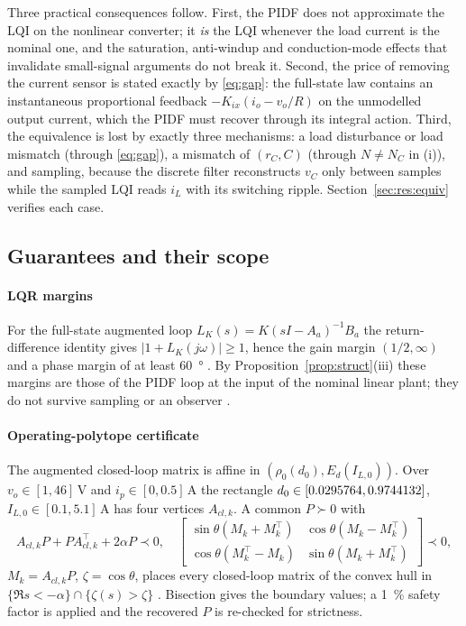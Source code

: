 Three practical consequences follow. First, the PIDF does not approximate the
LQI on the nonlinear converter; it \emph{is} the LQI whenever the load current
is the nominal one, and the saturation, anti-windup and conduction-mode effects
that invalidate small-signal arguments do not break it. Second, the price of
removing the current sensor is stated exactly by \eqref{eq:gap}: the full-state
law contains an instantaneous proportional feedback $-K_{ix}(i_o-v_o/R)$ on the
unmodelled output current, which the PIDF must recover through its integral
action. Third, the equivalence is lost by exactly three mechanisms: a load
disturbance or load mismatch (through \eqref{eq:gap}), a mismatch of $(r_C,C)$
(through $N\neq N_C$ in (i)), and sampling, because the discrete filter
reconstructs $v_C$ only between samples while the sampled LQI reads $i_L$ with
its switching ripple. Section~\ref{sec:res:equiv} verifies each case.

\subsection{Guarantees and their scope}
\paragraph{LQR margins} For the full-state augmented loop
$L_K(s)=K(sI-A_a)^{-1}B_a$ the return-difference identity gives
$|1+L_K(j\omega)|\ge1$, hence the gain margin $(1/2,\infty)$ and a phase margin of
at least \SI{60}{\degree} \citep{Safonov1977,Anderson1990}. By
Proposition~\ref{prop:struct}(iii) these margins are those of the PIDF loop at the
input of the nominal linear plant; they do not survive sampling or an observer
\citep{Doyle1978}.

\paragraph{Operating-polytope certificate} The augmented closed-loop matrix is
affine in $(\rho_0(d_0),E_d(I_{L,0}))$. Over $v_o\in[1,46]$\,V and $i_p\in[0,0.5]$\,A
the rectangle $d_0\in[0.0295764,0.9744132]$, $I_{L,0}\in[0.1,5.1]$\,A has four vertices
$A_{cl,k}$. A common $P\succ0$ with
\begin{equation}
A_{cl,k}P+PA_{cl,k}^\top+2\alpha P\prec0,\quad
\begin{bmatrix}\sin\theta(M_k+M_k^\top)&\cos\theta(M_k-M_k^\top)\\
\cos\theta(M_k^\top-M_k)&\sin\theta(M_k+M_k^\top)\end{bmatrix}\prec0,
\label{eq:lmi}
\end{equation}
$M_k=A_{cl,k}P$, $\zeta=\cos\theta$, places every closed-loop matrix of the convex
hull in $\{\Re s<-\alpha\}\cap\{\zeta(s)>\zeta\}$ \citep{Chilali1996}. Bisection
gives the boundary values; a \SI{1}{\percent} safety factor is applied and the
recovered $P$ is re-checked for strictness.

